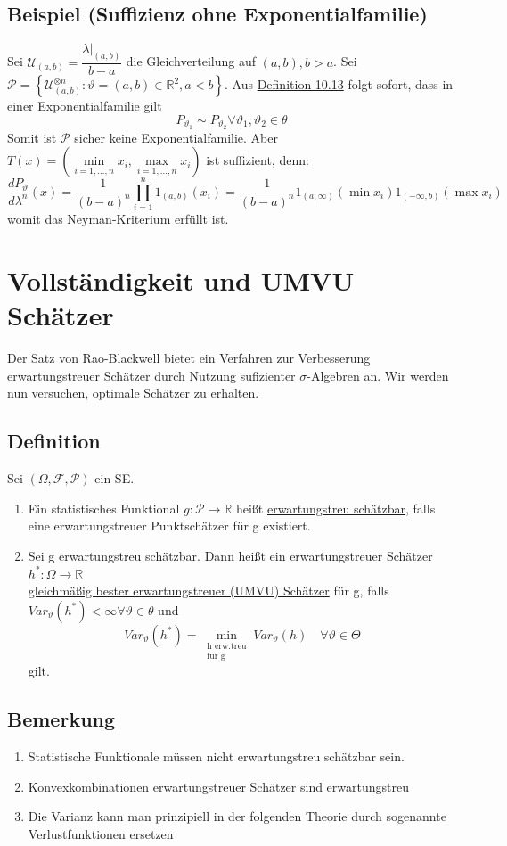 \documentclass[german,10pt,oneside, fleqn, a4paper]{article}
\newcommand {\R}	{\mathbb{R}}
\newcommand{\ra}{\rightarrow}
\newcommand{\brc}[1]{\left(#1\right)}
\newcommand{\brac}[1]{\left\lbrace #1\right\rbrace}
\newcommand{\mc}[1]{\mathcal{#1}}
\newcommand{\1}[1]{1_{#1}}
\newcommand{\2}[1]{\1{\brac{#1}}}
\newcommand{\f}{\mc{F}}
\newcommand{\p}{\mc{P}}
\newcommand{\stuff}{{\otimes n}}
\begin{document}
\subsection{Beispiel (Suffizienz ohne Exponentialfamilie)}
\label{10.16} 
Sei $\mc{U}_{(a,b)}=\dfrac{\lambda\vert_{(a,b)}}{b-a}$ die Gleichverteilung auf $(a,b), b>a$. Sei \\
$\mc{P}=\brac{\mc{U}_{(a,b)}^\stuff:\vartheta=(a,b)\in\R^2, a<b}$. Aus \hyperref[10.13]{Definition 10.13} folgt sofort, dass in einer Exponentialfamilie gilt\[
P_{\vartheta_1}\sim P_{\vartheta_2}\forall\vartheta_1,\vartheta_2\in\theta\]
Somit ist $\mc{P}$ sicher keine Exponentialfamilie. Aber $T(x)=\brc{\min\limits_{i=1,...,n}x_i,\max\limits_{i=1,...,n}x_i}$ ist suffizient, denn:\[
\dfrac{dP_\vartheta}{d\lambda^n}(x)=\dfrac{1}{(b-a)^n}\prod\limits_{i=1}^n1_{(a,b)}(x_i)=\dfrac{1}{(b-a)^n}1_{(a,\infty)}(\min x_i)1_{(-\infty,b)}(\max x_i)
\]
womit das Neyman-Kriterium erfüllt ist.

\section{Vollständigkeit und UMVU Schätzer}
Der Satz von Rao-Blackwell bietet ein Verfahren zur Verbesserung erwartungstreuer Schätzer durch Nutzung sufizienter $\sigma$-Algebren an. Wir werden nun versuchen, optimale Schätzer zu erhalten.

\subsection{Definition}
\label{11.1}
Sei $(\Omega,\f,\p)$ ein SE.\begin{enumerate}[label=(\alph*)]
\item Ein statistisches Funktional $g:\mc{P}\ra\R$ heißt \underline{erwartungstreu schätzbar}, falls eine erwartungstreuer Punktschätzer für g existiert.
\item Sei g erwartungstreu schätzbar. Dann heißt ein erwartungstreuer Schätzer $h^*:\Omega\ra\R$\\
\underline{gleichmäßig bester erwartungstreuer (UMVU) Schätzer} für g, falls $Var_\vartheta(h^*)<\infty\forall\vartheta\in\theta$ und\[
Var_{\vartheta}(h^*)=\min\limits_{\substack{\text{h erw.treu}\\\text{für g}}}Var_\vartheta(h)\quad\forall\vartheta\in\Theta\] gilt.
\end{enumerate}

\subsection{Bemerkung}
\begin{enumerate}[label=(\roman*)]
\item Statistische Funktionale müssen nicht erwartungstreu schätzbar sein.
\item Konvexkombinationen erwartungstreuer Schätzer sind erwartungstreu
\item Die Varianz kann man prinzipiell in der folgenden Theorie durch sogenannte Verlustfunktionen ersetzen
\end{enumerate}
\end{document}
